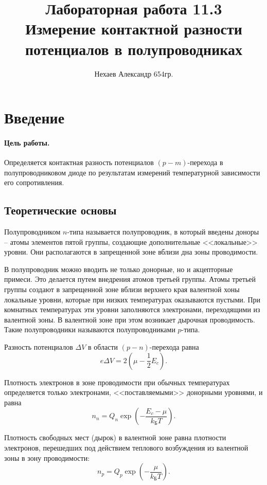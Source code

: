 \documentclass[a4paper, 12pt]{article}
\begin{document}
	\title{Лабораторная работа 11.3\\Измерение контактной разности потенциалов в полупроводниках}
	\author{Нехаев Александр 654гр.}
	\maketitle
	\tableofcontents
	\section{Введение}
	\paragraph{Цель работы.} Определяется контактная разность потенциалов $(p-m)$-перехода в полупроводниковом диоде по результатам измерений температурной зависимости его сопротивления.
	\subsection{Теоретические основы}
	Полупроводником $n$-типа называется полупроводник, в который введены доноры -- атомы элементов пятой группы, создающие дополнительные <<локальные>> уровни. Они располагаются в запрещенной зоне вблизи дна зоны проводимости.

	В полупроводник можно вводить не только донорные, но и акцепторные примеси. Это делается путем внедрения атомов третьей группы. Атомы третьей группы создают в запрещенной зоне вблизи верхнего края валентной хоны локальные уровни, которые при низких температурах оказываются пустыми. При комнатных температурах эти уровни заполняются электронами, переходящими из валентной зоны. В валентной зоне при этом возникает дырочная проводимость. Такие полупроводники называются полупроводниками $p$-типа.

	Разность потенциалов $\Delta V$ в области $(p-n)$-перехода равна
	\begin{equation}
		e\Delta V=2\left(\mu-\frac{1}{2}E_c\right).
	\end{equation}
	
	Плотность электронов в зоне проводимости при обычных температурах определяется только электронами, <<поставляемыми>> донорными уровнями, и равна
	\begin{equation}
		n_n=Q_n\exp{\left(-\frac{E_c-\mu}{k_{\text{Б}}T}\right)}.
	\end{equation}
	
	Плотность свободных мест (дырок) в валентной зоне равна плотности электронов, перешедших под действием теплового возбуждения из валентной зоны в зону проводимости:
	\begin{equation}
		n_p=Q_p\exp{\left(-\frac{\mu}{k_{\text{Б}}T}\right)}.
	\end{equation}
\end{document}
